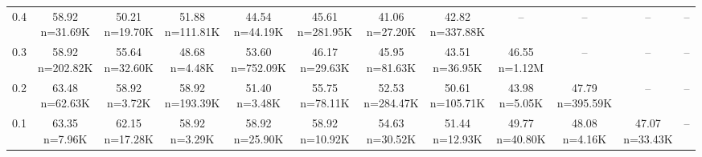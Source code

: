 \begin{table}
\begin{tabular}{lccccccccccc}
0.4 & \makecell{58.92 \\ \scriptsize n=31.69K} & \makecell{50.21 \\ \scriptsize n=19.70K} & \makecell{51.88 \\ \scriptsize n=111.81K} & \makecell{44.54 \\ \scriptsize n=44.19K} & \makecell{45.61 \\ \scriptsize n=281.95K} & \makecell{41.06 \\ \scriptsize n=27.20K} & \makecell{42.82 \\ \scriptsize n=337.88K} & -- & -- & -- & -- \\
0.3 & \makecell{58.92 \\ \scriptsize n=202.82K} & \makecell{55.64 \\ \scriptsize n=32.60K} & \makecell{48.68 \\ \scriptsize n=4.48K} & \makecell{53.60 \\ \scriptsize n=752.09K} & \makecell{46.17 \\ \scriptsize n=29.63K} & \makecell{45.95 \\ \scriptsize n=81.63K} & \makecell{43.51 \\ \scriptsize n=36.95K} & \makecell{46.55 \\ \scriptsize n=1.12M} & -- & -- & -- \\
0.2 & \makecell{63.48 \\ \scriptsize n=62.63K} & \makecell{58.92 \\ \scriptsize n=3.72K} & \makecell{58.92 \\ \scriptsize n=193.39K} & \makecell{51.40 \\ \scriptsize n=3.48K} & \makecell{55.75 \\ \scriptsize n=78.11K} & \makecell{52.53 \\ \scriptsize n=284.47K} & \makecell{50.61 \\ \scriptsize n=105.71K} & \makecell{43.98 \\ \scriptsize n=5.05K} & \makecell{47.79 \\ \scriptsize n=395.59K} & -- & -- \\
0.1 & \makecell{63.35 \\ \scriptsize n=7.96K} & \makecell{62.15 \\ \scriptsize n=17.28K} & \makecell{58.92 \\ \scriptsize n=3.29K} & \makecell{58.92 \\ \scriptsize n=25.90K} & \makecell{58.92 \\ \scriptsize n=10.92K} & \makecell{54.63 \\ \scriptsize n=30.52K} & \makecell{51.44 \\ \scriptsize n=12.93K} & \makecell{49.77 \\ \scriptsize n=40.80K} & \makecell{48.08 \\ \scriptsize n=4.16K} & \makecell{47.07 \\ \scriptsize n=33.43K} & -- \\

\end{tabular}
\end{table}

